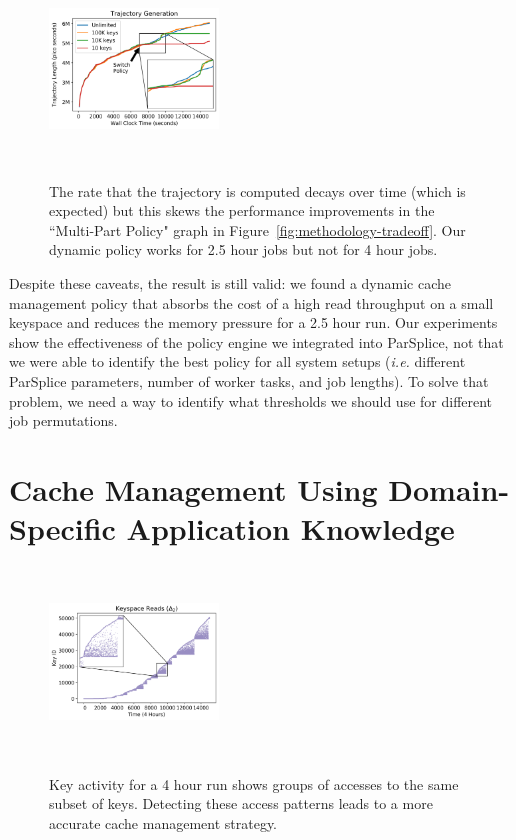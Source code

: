 \begin{figure}[t]
  \noindent\includegraphics[height=5cm,width=0.4\textwidth]{figures/methodology-trajectory.png}\\
  \caption{The rate that the trajectory is computed decays over time (which is
  expected) but this skews the performance improvements in the ``Multi-Part Policy" graph in 
  Figure~\ref{fig:methodology-tradeoff}. Our dynamic policy works for 2.5
  hour jobs but not for 4 hour jobs.  \label{fig:methodology-trajectory}}
\end{figure}

Despite these caveats, the result is still valid: we found a dynamic cache 
management policy that absorbs the cost of a high read throughput on a small
keyspace and reduces the memory pressure for a 2.5 hour run. Our experiments
show the effectiveness of the policy engine we integrated into
ParSplice, not that we were able to identify the best policy for all system
setups ({\it i.e.} different ParSplice parameters, number of worker tasks, and
job lengths).  To solve that problem, we need a way to identify what thresholds
we should use for different job permutations.

\section{Cache Management Using Domain-Specific Application Knowledge}
\label{sec:dom-specific}
\begin{figure}[t]
  \noindent\includegraphics[height=5cm,width=0.4\textwidth]{figures/keyspace-zoomed.png}\\

  \caption{Key activity for a 4 hour run shows groups of accesses to the same
  subset of keys. Detecting these access patterns leads to a more accurate cache
  management strategy.\label{fig:keyspace-zoomed}}

\end{figure}

